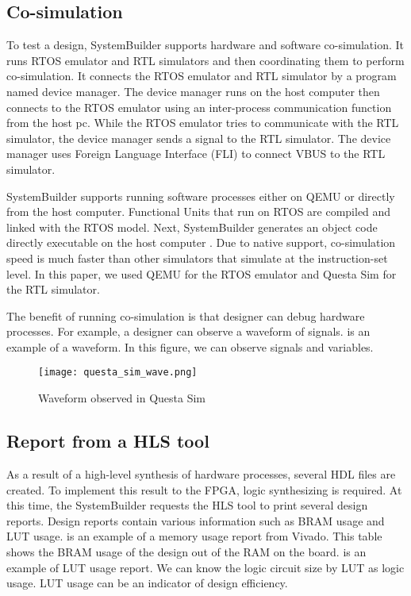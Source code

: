 \subsection{Co-simulation} \label{sec:cosimulation}
To test a design, SystemBuilder supports hardware and software co-simulation. It runs RTOS emulator and RTL simulators and then coordinating them to perform co-simulation. It connects the RTOS emulator and RTL simulator by a program named device manager. The device manager runs on the host computer then connects to the RTOS emulator using an inter-process communication function from the host pc. While the RTOS emulator tries to communicate with the RTL simulator, the device manager sends a signal to the RTL simulator. The device manager uses Foreign Language Interface (FLI) to connect VBUS to the RTL simulator.

SystemBuilder supports running software processes either on QEMU or directly from the host computer. Functional Units that run on RTOS are compiled and linked with the RTOS model. Next, SystemBuilder generates an object code directly executable on the host computer \cite{honda2004rtos}. Due to native support, co-simulation speed is much faster than other simulators that simulate at the instruction-set level. In this paper, we used QEMU for the RTOS emulator and Questa Sim for the RTL simulator.

The benefit of running co-simulation is that designer can debug hardware processes. For example, a designer can observe a waveform of signals.  is an example of a waveform. In this figure, we can observe signals and variables.

\begin{figure}[tbp]
  \centering
  \texttt{[image: questa\_sim\_wave.png]}
  \caption{Waveform observed in Questa Sim}%
  \label{fig:eg_waveform}
\end{figure}


\subsection{Report from a HLS tool}\label{sec:report}

As a result of a high-level synthesis of hardware processes, several HDL files are created. To implement this result to the FPGA, logic synthesizing is required. At this time, the SystemBuilder requests the HLS tool to print several design reports. Design reports contain various information such as BRAM usage and LUT usage.  is an example of a memory usage report from Vivado. This table shows the BRAM usage of the design out of the RAM on the board.  is an example of LUT usage report. We can know the logic circuit size by LUT as logic usage. LUT usage can be an indicator of design efficiency.

